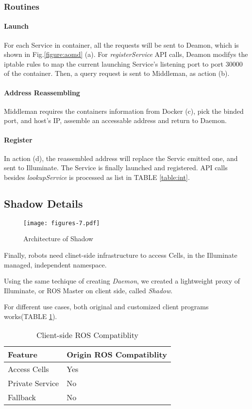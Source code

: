 \subsubsection{Routines}
\paragraph{Launch}
For each Service in container, all the requests will be sent to Deamon,
which is shown in Fig.\ref{figure:aomd} (a).
For \emph{registerService} API calls, Deamon modifys the iptable rules to
map the current launching Service's listening port to port 30000 of the container.
Then, a query request is sent to Middleman, as action (b).

\paragraph{Address Reassembling}
Middleman requires the containers information from Docker (c),
pick the binded port, and host's IP, assemble an accessable address and
return to Daemon. 

\paragraph{Register}
In action (d), the reassembled address will replace the Servic emitted one,
and sent to Illuminate.
The Service is finally launched and registered. API calls besides
\emph{lookupService} is processed as list in TABLE \ref{table:int}.

\subsection{Shadow Details}

\begin{figure}[!t]
\centering
\texttt{[image: figures-7.pdf]}
\caption{Architecture of Shadow}
\label{figure:aosh}
\end{figure}

Finally, robots need clinet-side infrastructure to access Cells,
in the Illuminate managed, independent namespace.

Using the same techique of creating \emph{Daemon}, we created a lightweight
proxy of Illuminate, or ROS Master on client side, called \emph{Shadow}.

For different use cases, both original and customized client programs
works(TABLE \ref{table:shadow-compatible}).

\begin{table}
  \caption{Client-side ROS Compatiblity}
  \label{table:shadow-compatible}
  \centering
  \begin{tabular}{ll}
    \hline
    \bfseries Feature & \bfseries Origin ROS Compatiblity \\
    \hline
    Access Cells    & Yes \\
    Private Service & No  \\
    Fallback        & No  \\
    \hline
  \end{tabular}
\end{table} 

